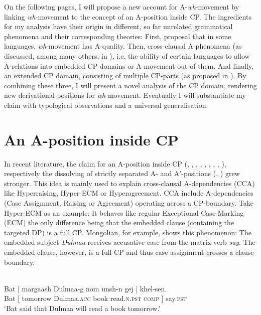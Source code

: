 \documentclass[output=paper,colorlinks,citecolor=brown]{langscibook}
\begin{document}
On the following pages, I will propose a new account for A-\textit{wh}-movement by linking \textit{wh}-movement to the concept of an A-position inside CP. The ingredients for my analysis have their origin in different, so far unrelated grammatical phenomena and their corresponding theories: First,  proposal that in some languages, \textit{wh}-movement has A-quality. Then, cross-clausal A-phenomena (as discussed, among many others, in \citealp{wurmbrand2018cross}), i.e. the ability of certain languages to allow A-relations into embedded CP domains or A-movement out of them. And finally, an extended CP domain, consisting of multiple CP-parts (as proposed in \citealp{rizzi1997fine}). By combining these three, I will present a novel analysis of the CP domain, rendering new derivational positions for \textit{wh}-movement. Eventually I will substantiate my claim with typological observations and a universal generalisation. 

\section{An A-position inside CP}
In recent literature, the claim for an A-position inside CP (\citealp{tanaka2002raising}, \citealp{csener2008non}, \citealp{takeuchi2010exceptional}, \citealp{alboiu2011case}, \citealp{bondarenko2017ecm}, \citealp{zyman2017p}, \citealp{zyman2018rich}, \citealp{wurmbrand2018cross},  \citealp{fong2019proper}), respectively the dissolving of strictly separated A- and A'-positions (\citealp{obata2011feature}, \citealp{vanUrk2015}) grew stronger. This idea is mainly used to explain cross-clausal A-dependencies (CCA) like Hyperraising, Hyper-ECM or Hyperagreement. CCA include A-dependencies (Case Assignment, Raising or Agreement) operating across a CP-boundary. Take Hyper-ECM as an example: It behaves like regular Exceptional Case-Marking (ECM) the only difference being that the embedded clause (containing the targeted DP) is a full CP. Mongolian, for example, shows this phenomenon: The embedded subject \emph{Dulmaa} receives accusative case from the matrix verb \emph{say}. The embedded clause, however, is a full CP and thus case assignment crosses a clause boundary.

 \citep[2]{fong2019proper}\\
\gll Bat [ margaash Dulmaa-g nom unsh-n gej ] khel-sen.\\
Bat [ tomorrow Dulmaa.\textsc{acc} book read.\textsc{n.pst} \textsc{comp} ] say.\textsc{pst}\\
\glt `Bat said that Dulmaa will read a book tomorrow.'
\z
\end{document}
